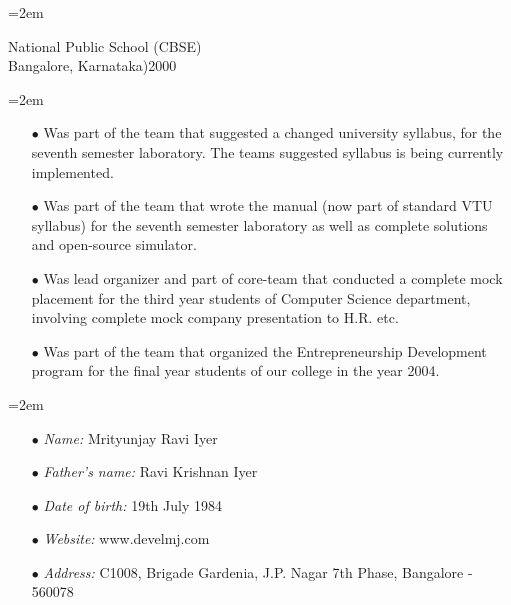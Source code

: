 \documentclass{scrartcl}	%
\newcommand{\MarginDate}[1]{\marginpar{\raggedleft\itshape\small#1}}
\newcommand{\Description}[1]{\hangindent=2em\hangafter=0\noindent\raggedright\footnotesize{#1}\par\normalsize}
\begin{document}
\begin{cv}{
}
\vspace{1em}

\Description{National Public School (CBSE)\MarginDate{Standard 10}\\Bangalore, Karnataka)\hfill{2000}
}

\vspace{1.5em}

\noindent{}
\vspace{0.5em}

\Description{
\begin{itemize}
  \item[\footnotesize$\bullet$] Was part of the team that suggested a changed university syllabus, for the seventh semester laboratory. The teams suggested syllabus is being currently implemented.
  \item[\footnotesize$\bullet$] Was part of the team that wrote the manual (now part of
  standard VTU syllabus) for the seventh
  semester laboratory as well as complete solutions and open-source
  simulator.
  \item[\footnotesize$\bullet$] Was lead organizer and part of core-team that conducted a complete mock placement for the third year students of Computer Science department, involving complete mock company presentation to H.R. etc.
  \item[\footnotesize$\bullet$] Was part of the team that organized
    the Entrepreneurship Development program for the final year
    students of our college in the year 2004.
\end{itemize}
}

\vspace{1.5em}

\noindent{}
\vspace{0.5em}

\Description{
\begin{itemize}
  \item[\footnotesize$\bullet$] \textsl{Name:} Mrityunjay Ravi Iyer
  \item[\footnotesize$\bullet$] \textsl{Father's name:} Ravi Krishnan Iyer
  \item[\footnotesize$\bullet$] \textsl{Date of birth:} 19th July 1984
  \item[\footnotesize$\bullet$] \textsl{Website:} www.develmj.com
  \item[\footnotesize$\bullet$] \textsl{Address:} C1008, Brigade
    Gardenia, J.P. Nagar 7th Phase, Bangalore - 560078
\end{itemize}
}
\end{cv}
\end{document}

